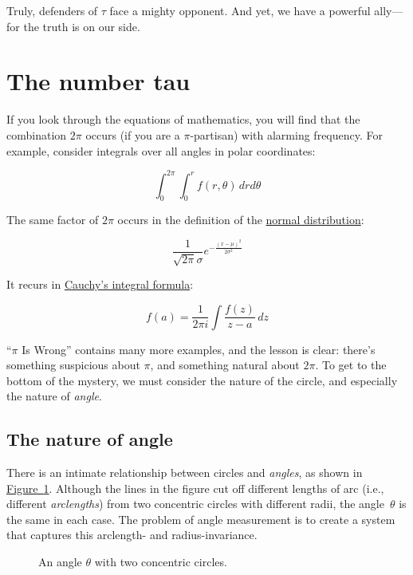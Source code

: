 \documentclass{article}
\begin{document}
Truly, defenders of $\tau$ face a mighty opponent. And yet, we have a powerful ally---for the truth is on our side.


\section{The number tau} %
\label{sec:the_number_tau}

If you look through the equations of mathematics, you will find that the combination $2\pi$ occurs (if you are a $\pi$-partisan) with alarming frequency. For example, consider integrals over all angles in polar coordinates:

\[
  \int_0^{2\pi}\int_0^r f(r, \theta)\, dr d\theta
\]

\noindent The same factor of $2\pi$ occurs in the definition of the \href{http://en.wikipedia.org/wiki/Normal_distribution}{normal distribution}:

\[
  \frac{1}{\sqrt{2\pi}\sigma}e^{-\frac{(x-\mu)^2}{2\sigma^2}}
\]

\noindent It recurs in \href{http://en.wikipedia.org/wiki/Cauchy's_integral_formula}{Cauchy's integral formula}:

\[
  f(a) = \frac{1}{2\pi i}\int\frac{f(z)}{z-a}\,dz
\]

\noindent ``$\pi$ Is Wrong'' contains many more examples, and the lesson is clear: there's something suspicious about $\pi$, and something natural about $2\pi$. To get to the bottom of the mystery, we must consider the nature of the circle, and especially the nature of \emph{angle}.

  \subsection{The nature of angle} %
  \label{sec:the_nature_of_angle}

There is an intimate relationship between circles and \emph{angles}, as shown in \hyperref[fig:angle-arclength]{Figure~}\ref{fig:angle-arclength}. Although the lines in the figure cut off different lengths of arc (i.e., different \emph{arclengths}) from two concentric circles with different radii, the angle~$\theta$ is the same in each case. The problem of angle measurement is to create a system that captures this arclength- and radius-invariance.

\begin{figure}
\begin{center}
\end{center}
\caption{An angle $\theta$ with two concentric circles.\label{fig:angle-arclength}}
\end{figure}
\end{document}
